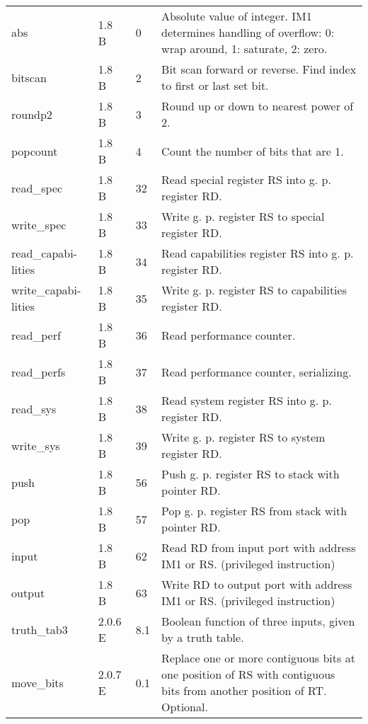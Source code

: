 \documentclass[forwardcom.tex]{subfiles}
\begin{document}
\begin{longtable} {|p{25mm}|p{14mm}|p{10mm}|p{95mm}|}
abs           & 1.8 B &  0  & Absolute value of integer. IM1 determines handling of overflow: 0: wrap around, 1: saturate, 2: zero. \\
bitscan       & 1.8 B &  2 & Bit scan forward or reverse. Find index to first or last set bit. \\
roundp2       & 1.8 B &  3 & Round up or down to nearest power of 2. \\
popcount      & 1.8 B &  4 & Count the number of bits that are 1.\\
read\_spec    & 1.8 B & 32  & Read special register RS into g. p. register RD. \\
write\_spec   & 1.8 B & 33  & Write g. p. register RS to special register RD. \\
read\_capabi-lities & 1.8 B & 34  & Read capabilities register RS into g. p. register RD. \\
write\_capabi-lities & 1.8 B & 35  & Write g. p. register RS to capabilities register RD. \\
read\_perf    & 1.8 B & 36  & Read performance counter. \\
read\_perfs   & 1.8 B & 37  & Read performance counter, serializing. \\
read\_sys     & 1.8 B & 38  & Read system register RS into g. p. register RD. \\
write\_sys    & 1.8 B & 39  & Write g. p. register RS to system register RD. \\
push          & 1.8 B & 56  & Push g. p. register RS to stack with pointer RD. \\
pop           & 1.8 B & 57  & Pop g. p. register RS from stack with pointer RD. \\
input         & 1.8 B & 62  & Read RD from input port with address IM1 or RS. (privileged instruction) \\
output        & 1.8 B & 63  & Write RD to output port with address IM1 or RS. (privileged instruction) \\

truth\_tab3   & 2.0.6 E & 8.1 & Boolean function of three inputs, given by a truth table. \\

move\_bits    & 2.0.7 E & 0.1 & Replace one or more contiguous bits at one position of RS with contiguous bits from another position of RT. Optional. \\


\end{longtable}
\end{document}
